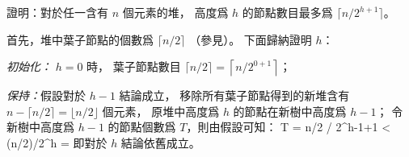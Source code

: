 \startEXERCISE
證明：對於任一含有 $n$ 個元素的堆，
高度爲 $h$ 的節點數目最多爲 $\lceil n/2^{h+1} \rceil$。
\stopEXERCISE

\startANSWER
首先，堆中葉子節點的個數爲 $\lceil n/2 \rceil$ （參見）。
下面歸納證明 $h$：

\emph{初始化：} $h = 0$ 時，
葉子節點數目 $\lceil n/2 \rceil = \left\lceil n/2^{0+1} \right\rceil$；

\emph{保持：}假設對於 $h - 1$ 結論成立，
移除所有葉子節點得到的新堆含有 $n-\lceil n/2 \rceil = \lfloor n/2 \rfloor$ 個元素，
原堆中高度爲 $h$ 的節點在新樹中高度爲 $h-1$；
令新樹中高度爲 $h-1$ 的節點個數爲 $T$，則由假設可知：
\startsplitformula\startmathalignment
\NC T \NC = \lceil \lfloor n/2 \rfloor / 2^{h-1+1} \rceil \NR
\NC \NC < \lceil (n/2)/2^h \rceil \NR
\NC \NC = \left\lceil {} \right\rceil \NR
\stopmathalignment\stopsplitformula
即對於 $h$ 結論依舊成立。
\stopANSWER
